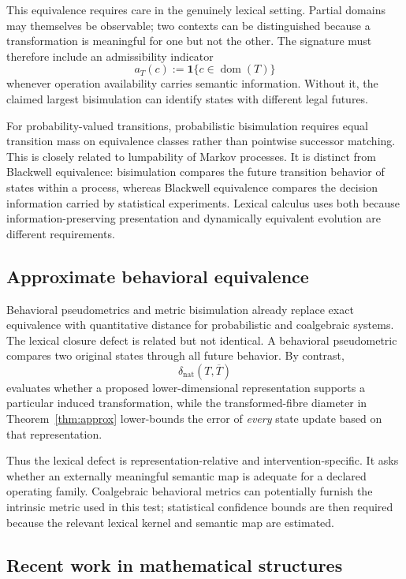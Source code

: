 \documentclass[11pt]{article}
\begin{document}
{This equivalence requires care in the genuinely lexical setting. Partial domains may themselves be observable; two contexts can be distinguished because a transformation is meaningful for one but not the other. The signature must therefore include an admissibility indicator
\[
 a_T(c):=\bm 1\{c\in\operatorname{dom}(T)\}
\]
whenever operation availability carries semantic information. Without it, the claimed largest bisimulation can identify states with different legal futures.

For probability-valued transitions, probabilistic bisimulation requires equal transition mass on equivalence classes rather than pointwise successor matching. This is closely related to lumpability of Markov processes. It is distinct from Blackwell equivalence: bisimulation compares the future transition behavior of states within a process, whereas Blackwell equivalence compares the decision information carried by statistical experiments. Lexical calculus uses both because information-preserving presentation and dynamically equivalent evolution are different requirements.

\subsection{Approximate behavioral equivalence}

Behavioral pseudometrics and metric bisimulation already replace exact equivalence with quantitative distance for probabilistic and coalgebraic systems. The lexical closure defect is related but not identical. A behavioral pseudometric compares two original states through all future behavior. By contrast,
\[
 \delta_{\mathrm{nat}}(T,\overline T)
\]
evaluates whether a proposed lower-dimensional representation supports a particular induced transformation, while the transformed-fibre diameter in Theorem~\ref{thm:approx} lower-bounds the error of \emph{every} state update based on that representation.

Thus the lexical defect is representation-relative and intervention-specific. It asks whether an externally meaningful semantic map is adequate for a declared operating family. Coalgebraic behavioral metrics can potentially furnish the intrinsic metric used in this test; statistical confidence bounds are then required because the relevant lexical kernel and semantic map are estimated.

\subsection{Recent work in mathematical structures}

}
\end{document}
